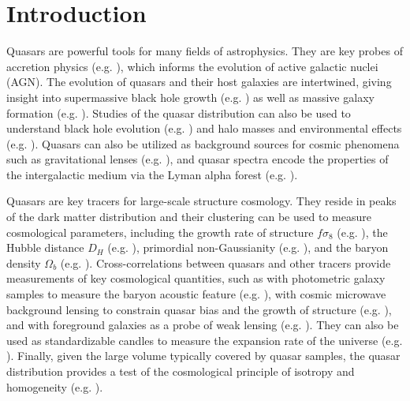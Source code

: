 \section{Introduction}

Quasars are powerful tools for many fields of astrophysics. 
They are key probes of accretion physics (e.g. \citealt{SunyaevZeldovich1970, yu_quasar_2020}), which informs the evolution of active galactic nuclei (AGN). 
The evolution of quasars and their host galaxies are intertwined, giving insight into supermassive black hole growth (e.g. \citealt{hopkins_unified_2006}) as well as massive galaxy formation (e.g. \citealt{kormendy_coevolution_2013}).
Studies of the quasar distribution can also be used to understand black hole evolution (e.g. \citealt{powell_clustering_2020}) and halo masses and environmental effects (e.g. \citealt{dipompeo_characteristic_2017}).
Quasars can also be utilized as background sources for cosmic phenomena such as gravitational lenses (e.g. \citealt{claeskens_gravitational_2002}), and quasar spectra encode the properties of the intergalactic medium via the Lyman alpha forest (e.g. \citealt{rauch_lyman_1998}). 

Quasars are key tracers for large-scale structure cosmology.
They reside in peaks of the dark matter distribution and their clustering can be used to measure cosmological parameters, including the growth rate of structure $f\sigma_8$ (e.g. \citealt{garcia-garcia_growth_2021, quaia-s8}), the Hubble distance $D_H$ (e.g. \citealt{hou_completed_2020}), primordial non-Gaussianity (e.g. \citealt{leistedt_constraints_2014, castorina_redshift-weighted_2019, krolewski_constraining_2023}), and the baryon density $\Omega_b$ (e.g. \citealt{yahata_large-scale_2005}). 
Cross-correlations between quasars and other tracers provide measurements of key cosmological quantities, such as with photometric galaxy samples to measure the baryon acoustic feature (e.g. \citealt{ata_clustering_2018}), with cosmic microwave background lensing to constrain quasar bias and the growth of structure (e.g. \citealt{sherwin_atacama_2012}), and with foreground galaxies as a probe of weak lensing (e.g. \citealt{menard_cosmological_2002, scranton_detection_2005, zarrouk_baryon_2021}).
They can also be used as standardizable candles to measure the expansion rate of the universe (e.g. \citealt{setti_hubble_1973, risaliti_hubble_2015, lusso_quasars_2020}).
Finally, given the large volume typically covered by quasar samples, the quasar distribution provides a test of the cosmological principle of isotropy and homogeneity (e.g. \citealt{secrest_test_2021, dam_testing_2022, quaia-homogeneity}). 

